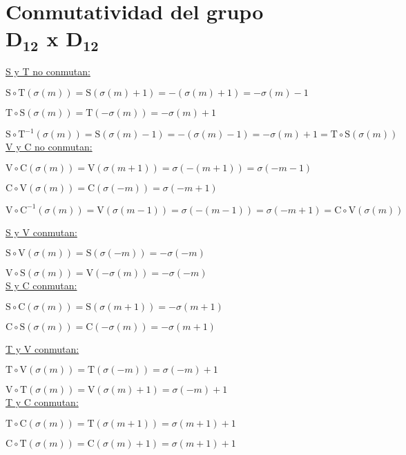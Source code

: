 	\chapter[Conmutatividad del grupo D$_{\textbf{12}}$ x D$_{\textbf{12}}$]{Conmutatividad del grupo \\D$_{\textbf{12}}$ x D$_{\textbf{12}}$}
	\label{app:commm}
		\vspace{-1cm}\underline{S y T no conmutan:}
		
		$\text{S}\circ\text{T}(\sigma(m))=\text{S}(\sigma(m)+1)=-(\sigma(m)+1)=-\sigma(m)-1$
		
		$\text{T}\circ\text{S}(\sigma(m))=\text{T}(-\sigma(m))=-\sigma(m)+1$
		
		$\text{S}\circ\text{T}^{-1}(\sigma(m))=\text{S}(\sigma(m)-1)=-(\sigma(m)-1)=-\sigma(m)+1=\text{T}\circ\text{S}(\sigma(m))$\\
		
		\underline{V y C no conmutan:}
		
		$\text{V}\circ\text{C}(\sigma(m))=\text{V}(\sigma(m+1))=\sigma(-(m+1))=\sigma(-m-1)$
		
		$\text{C}\circ\text{V}(\sigma(m))=\text{C}(\sigma(-m))=\sigma(-m+1)$
		
		$\text{V}\circ\text{C}^{-1}(\sigma(m))=\text{V}(\sigma(m-1))=\sigma(-(m-1))=\sigma(-m+1)=\text{C}\circ\text{V}(\sigma(m))$\\
		
		\begin{multicols}{2}\underline{S y V conmutan:}
		
		$\text{S}\circ\text{V}(\sigma(m))=\text{S}(\sigma(-m))=-\sigma(-m)$
		
		$\text{V}\circ\text{S}(\sigma(m))=\text{V}(-\sigma(m))=-\sigma(-m)$\\
		
		\underline{S y C conmutan:}
		
		$\text{S}\circ\text{C}(\sigma(m))=\text{S}(\sigma(m+1))=-\sigma(m+1)$
		
		$\text{C}\circ\text{S}(\sigma(m))=\text{C}(-\sigma(m))=-\sigma(m+1)$
		
		\underline{T y V conmutan:}
		
		$\text{T}\circ\text{V}(\sigma(m))=\text{T}(\sigma(-m))=\sigma(-m)+1$
		
		$\text{V}\circ\text{T}(\sigma(m))=\text{V}(\sigma(m)+1)=\sigma(-m)+1$\\
		
		\underline{T y C conmutan:}
		
		$\text{T}\circ\text{C}(\sigma(m))=\text{T}(\sigma(m+1))=\sigma(m+1)+1$
		
		$\text{C}\circ\text{T}(\sigma(m))=\text{C}(\sigma(m)+1)=\sigma(m+1)+1$
		\end{multicols}